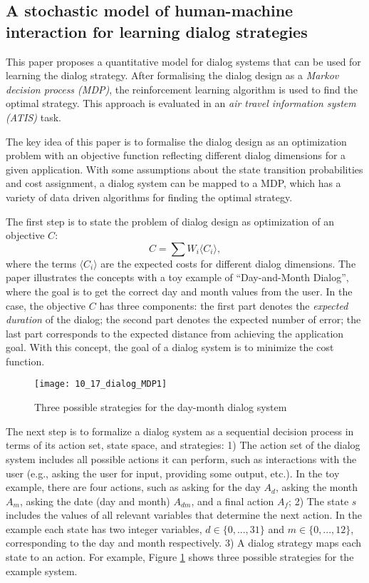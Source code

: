 \subsection{A stochastic model of human-machine interaction for learning dialog strategies \cite{Levin2000A}}

This paper proposes a quantitative model for dialog systems that can be used for learning the dialog strategy. After formalising the dialog design as a \emph{Markov decision process (MDP)}, the reinforcement learning algorithm is used to find the optimal strategy. This approach is evaluated in an \emph{air travel information system (ATIS)} task.

The key idea of this paper is to formalise the dialog design as an optimization problem with an objective function reflecting different dialog dimensions for a given application. With some assumptions about the state transition probabilities and cost assignment, a dialog system can be mapped to a MDP, which has a variety of data driven algorithms for finding the optimal strategy.

The first step is to state the problem of dialog design as optimization of an objective $C$:
$$C = \sum W_i \langle C_i \rangle,$$
where the terms $\langle C_i \rangle$ are the expected costs for different dialog dimensions. The paper illustrates the concepts with a toy example of ``Day-and-Month Dialog'', where the goal is to get the correct day and month values from the user. In the case, the objective $C$ has three components: the first part denotes the \emph{expected duration} of the dialog; the second part denotes the expected number of error; the last part corresponds to the expected distance from achieving the application goal. With this concept, the goal of a dialog system is to minimize the cost function.

\begin{figure}[htbp]
  \centering
  \texttt{[image: 10\_17\_dialog\_MDP1]}\\
  \caption{Three possible strategies for the day-month dialog system}\label{fig:dialog_MDP1}
\end{figure}

The next step is to formalize a dialog system as a sequential decision process in terms of its action set, state space, and strategies: 1) The action set of the dialog system includes all possible actions it can perform, such as interactions with the user (e.g., asking the user for input, providing some output, etc.). In the toy example, there are four actions, such as asking for the day $A_d$, asking the month $A_m$, asking the date (day and month) $A_{dm}$, and a final action $A_f$; 2) The state $s$ includes the values of all relevant variables that determine the next action. In the example each state has two integer variables, $d \in \{0, ..., 31\}$ and $m \in \{0, ..., 12\}$, corresponding to the day and month respectively. 3) A dialog strategy maps each state to an action. For example, Figure \ref{fig:dialog_MDP1} shows three possible strategies for the example system.

